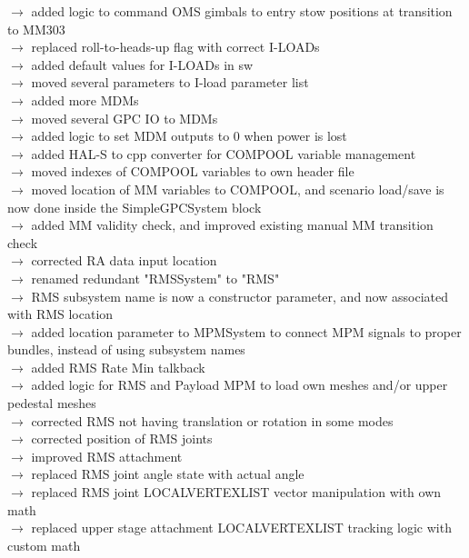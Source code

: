 \documentclass[Space_Shuttle_Vessel_Manual.tex]{subfiles}
\begin{document}
$\rightarrow$ added logic to command OMS gimbals to entry stow positions at transition to MM303\\
$\rightarrow$ replaced roll-to-heads-up flag with correct I-LOADs\\
$\rightarrow$ added default values for I-LOADs in sw\\
$\rightarrow$ moved several parameters to I-load parameter list\\
$\rightarrow$ added more MDMs\\
$\rightarrow$ moved several GPC IO to MDMs\\
$\rightarrow$ added logic to set MDM outputs to 0 when power is lost\\
$\rightarrow$ added HAL-S to cpp converter for COMPOOL variable management\\
$\rightarrow$ moved indexes of COMPOOL variables to own header file\\
$\rightarrow$ moved location of MM variables to COMPOOL, and scenario load/save is now done inside the SimpleGPCSystem block\\
$\rightarrow$ added MM validity check, and improved existing manual MM transition check\\
$\rightarrow$ corrected RA data input location\\
$\rightarrow$ renamed redundant "RMSSystem" to "RMS"\\
$\rightarrow$ RMS subsystem name is now a constructor parameter, and now associated with RMS location\\
$\rightarrow$ added location parameter to MPMSystem to connect MPM signals to proper bundles, instead of using subsystem names\\
$\rightarrow$ added RMS Rate Min talkback\\
$\rightarrow$ added logic for RMS and Payload MPM to load own meshes and/or upper pedestal meshes\\
$\rightarrow$ corrected RMS not having translation or rotation in some modes\\
$\rightarrow$ corrected position of RMS joints\\
$\rightarrow$ improved RMS attachment\\
$\rightarrow$ replaced RMS joint angle state with actual angle\\
$\rightarrow$ replaced RMS joint LOCALVERTEXLIST vector manipulation with own math\\
$\rightarrow$ replaced upper stage attachment LOCALVERTEXLIST tracking logic with custom math\\
\end{document}
